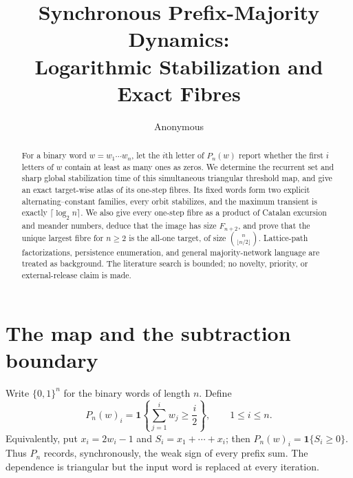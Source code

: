 \documentclass[10pt,a4paper]{amsart}
\title[Prefix-majority dynamics]{Synchronous Prefix-Majority Dynamics:\\
Logarithmic Stabilization and Exact Fibres}
\author{Anonymous}
\date{}
\theoremstyle{definition}
\theoremstyle{remark}
\begin{document}
\begin{abstract}
For a binary word $w=w_1\cdots w_n$, let the $i$th letter of $P_n(w)$ report
whether the first $i$ letters of $w$ contain at least as many ones as zeros.
We determine the recurrent set and sharp global stabilization time of this
simultaneous triangular threshold map, and give an exact target-wise atlas of
its one-step fibres.  Its fixed words form two explicit alternating--constant
families, every orbit stabilizes, and the maximum transient is exactly
$\lceil\log_2 n\rceil$.  We also give every one-step fibre as a product of
Catalan excursion and meander numbers, deduce that the image has size
$F_{n+2}$, and prove that the unique largest fibre for $n\ge2$ is the
all-one target, of size $\binom n{\lfloor n/2\rfloor}$.  Lattice-path
factorizations, persistence enumeration, and general majority-network
language are treated as background.  The literature search is bounded; no
novelty, priority, or external-release claim is made.
\end{abstract}

\maketitle

\section{The map and the subtraction boundary}

Write $\{0,1\}^n$ for the binary words of length $n$.  Define
\begin{equation}
 P_n(w)_i=\mathbf 1\!\left\{\sum_{j=1}^i w_j\ge \frac i2\right\},
 \qquad 1\le i\le n.                                  \label{eq:update}
\end{equation}
Equivalently, put $x_i=2w_i-1$ and $S_i=x_1+\cdots+x_i$; then
$P_n(w)_i=\mathbf1\{S_i\ge0\}$.  Thus $P_n$ records, synchronously, the
weak sign of every prefix sum.  The dependence is triangular but the input
word is replaced at every iteration.
\end{document}
